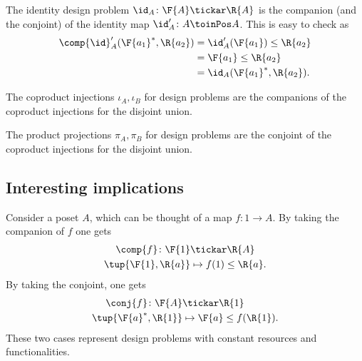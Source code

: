\begin{example}The identity design problem $\id_A\colon \F{A} \tickar \R{A}$ is the companion (and the conjoint) of the identity map $\id_A'\colon A \toinPos A$. This is easy to check as
\begin{equation}
    \begin{aligned}
    \comp{\id}_A'(\F{a_1}^*,\R{a_2})&=\id_A'(\F{a_1})\leq \R{a_2}\\
    &=\F{a_1}\leq \R{a_2}\\
    &=\id_A(\F{a_1}^*,\R{a_2}).
    \end{aligned}
\end{equation}
\end{example}

\begin{example}The coproduct injections $\iota_A, \iota_B$ for design problems are the companions of the coproduct injections for the disjoint union.
\end{example}

\begin{example}The product projections $\pi_A, \pi_B$ for design problems are the conjoint of the coproduct injections for the disjoint union.
\end{example}


\subsection{Interesting implications}
Consider a poset $A$, which can be thought of a map $f\colon 1\to A$. By taking the companion of $f$ one gets
\begin{equation}
\begin{aligned}
    \comp{f}\colon \F{1}&\tickar \R{A}\\
    \tup{\F{1},\R{a}}&\mapsto f(1)\leq \R{a}.
\end{aligned}
\end{equation}
By taking the conjoint, one gets
\begin{equation}
\begin{aligned}
    \conj{f}\colon \F{A}&\tickar \R{1}\\
    \tup{\F{a}^*,\R{1}}&\mapsto \F{a}\leq f(\R{1}).
\end{aligned}
\end{equation}
These two cases represent design problems with constant resources and functionalities.

